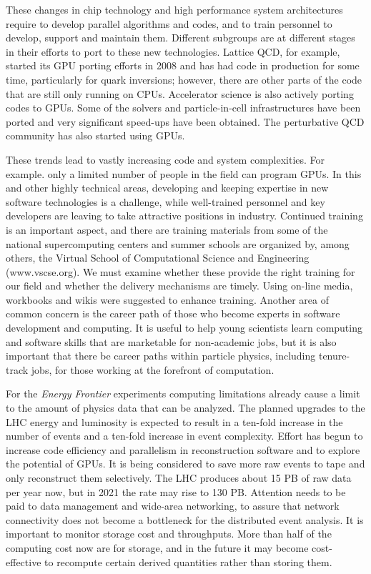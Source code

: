 These changes in chip technology and high performance system architectures require to develop parallel algorithms and codes, and to train personnel to develop, support and maintain them. Different subgroups are at different stages in their efforts to port to these new technologies.  Lattice QCD, for example, started its GPU porting efforts in 2008 and has had code in production for some time, particularly for quark inversions; however, there are other parts of the code that are still only running on CPUs.  Accelerator science is also actively porting codes to GPUs. Some of the solvers and particle-in-cell infrastructures have been ported and very significant speed-ups have been obtained. The perturbative QCD community has also started using GPUs.

These trends lead to vastly increasing code and system complexities. For example. only a limited number of people in the field can program GPUs. In this and other highly technical areas, developing and keeping expertise in new software technologies is a challenge, while well-trained personnel and key developers are leaving to take attractive positions in industry. Continued training is an important aspect, and there are training materials from some of the national supercomputing centers and summer schools are organized by, among others, the Virtual School of Computational Science and Engineering (www.vscse.org). We must examine whether these provide the right training for our field and whether the delivery mechanisms are timely.  Using on-line media, workbooks and wikis were suggested to enhance training.  Another area of common concern is the career path of those who become experts in software development and computing.  It is useful to help young scientists learn computing and software skills that are marketable for non-academic jobs, but it is also important that there be career paths within particle physics, including tenure-track jobs, for those working at the forefront of computation.

For the {\it Energy Frontier} experiments computing limitations already cause a limit to the amount of physics data that can be analyzed. The planned upgrades to the LHC energy and luminosity is expected to result in a ten-fold increase in the number of events and a ten-fold increase in event complexity.  Effort has begun to increase code efficiency and parallelism in reconstruction software and to explore the potential of GPUs.   It is being considered to save more raw events to tape and only reconstruct them selectively. The LHC produces about 15 PB of raw data per year now, but in 2021 the rate may rise to 130 PB.  Attention needs to be paid to data management and wide-area networking, to assure that network connectivity does not become a bottleneck for the distributed event analysis. It is  important to monitor storage cost and throughputs. More than half of the computing cost now are for storage, and in the future it may become cost-effective to recompute certain derived quantities rather than storing them.

